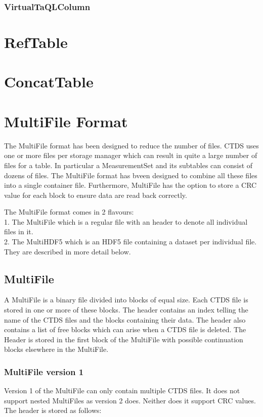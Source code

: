 \begin{itemize}
\begin{itemize}
\subsubsection{VirtualTaQLColumn}


\section{RefTable}

\section{ConcatTable}

\section{\label{CTDS:MULTIFILE}MultiFile Format}
The MultiFile format has been designed to reduce the number of
files. CTDS uses one or more files per storage manager which can
result in quite a large number of files for a table.
In particular a MeasurementSet and its subtables can consist of dozens
of files.
The MultiFile format has bveen designed to combine all these files into a single
container file. Furthermore, MultiFile has the option to store a CRC
value for each block to ensure data are read back correctly.

The MultiFile format comes in 2 flavours:
\\1. The MultiFile which is a regular file with an header to denote all
individual files in it.
\\2. The MultiHDF5 which is an HDF5 file containing a dataset per
individual file. 
\\They are described in more detail below.

\subsection{MultiFile}
A MultiFile is a binary file divided into blocks of equal size. Each CTDS
file is stored in one or more of these blocks. The header contains an index telling the name
of the CTDS files and the blocks containing their data. The header also
contains a list of free blocks which can arise when a CTDS file is
deleted.
The Header is stored in the first block of the MultiFile with possible
continuation blocks elsewhere in the MultiFile. 

\subsubsection{MultiFile version 1}
Version 1 of the MultiFile can only contain multiple CTDS files. It
does not support nested MultiFiles as version 2 does. Neither does it
support CRC values.
The header is stored as follows:


\end{itemize}
\end{itemize}
